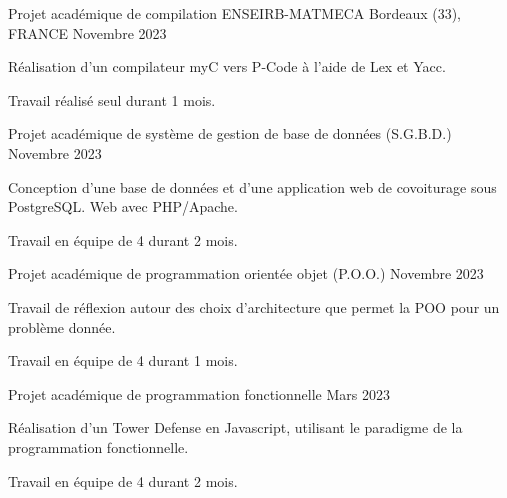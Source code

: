 

\begin{cventries}

  \cventry
    {Projet académique de compilation} %
    {ENSEIRB-MATMECA} %
    {Bordeaux (33), FRANCE} %
    {Novembre 2023} %
    {
      \begin{cvitems} %
        \item{Réalisation d'un compilateur myC vers P-Code à l'aide de Lex et Yacc.}
        \item{Travail réalisé seul durant 1 mois.}
      \end{cvitems}
    }

  \cventry
    {Projet académique de système de gestion de base de données (S.G.B.D.)} %
    {} %
    {} %
    {Novembre 2023} %
    {
      \begin{cvitems} %
        \item{Conception d'une base de données et d'une application web de covoiturage sous PostgreSQL. Web avec PHP/Apache.}
        \item{Travail en équipe de 4 durant 2 mois.}
      \end{cvitems}
    }

  \cventry
    {Projet académique de programmation orientée objet (P.O.O.)} %
    {} %
    {} %
    {Novembre 2023} %
    {
      \begin{cvitems} %
        \item{Travail de réflexion autour des choix d'architecture que permet la POO pour un problème donnée.}
        \item{Travail en équipe de 4 durant 1 mois.}
      \end{cvitems}
    }

  \cventry
    {Projet académique de programmation fonctionnelle} %
    {} %
    {} %
    {Mars 2023} %
    {
      \begin{cvitems} %
        \item{Réalisation d'un Tower Defense en Javascript, utilisant le paradigme de la programmation fonctionnelle.}
        \item{Travail en équipe de 4 durant 2 mois.}
      \end{cvitems}
    }


\end{cventries}
